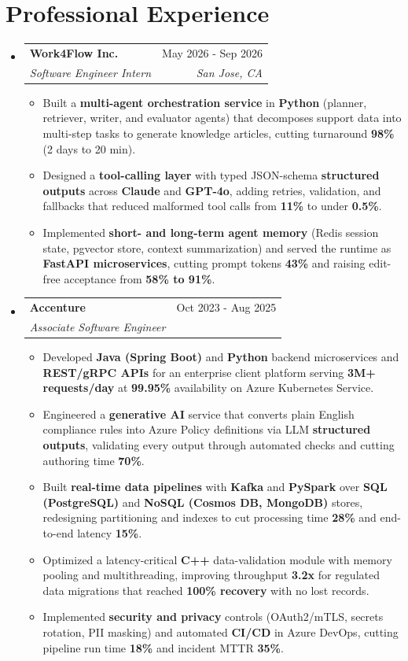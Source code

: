\documentclass[letterpaper,10.5pt]{article}
\makeatletter
\newcommand{\resumeItem}[1]{\item\small{{#1 \vspace{-2.5pt}}}}
\newcommand{\resumeSubheading}[4]{
  \vspace{-2pt}\item
    \begin{tabular*}{0.98\textwidth}[t]{l@{\extracolsep{\fill}}r}
      \textbf{#1} & #2 \\
      \textit{\small#3} & \textit{\small #4} \\
    \end{tabular*}\vspace{-6pt}
}
\newcommand{\sqbullet}{\raisebox{0.15ex}{\scriptsize$\blacksquare$}}
\newcommand{\resumeSubHeadingListStart}{\begin{itemize}[leftmargin=0.15in, label=\sqbullet]}
\newcommand{\resumeSubHeadingListEnd}{\end{itemize}}
\newcommand{\resumeItemListStart}{\begin{itemize}[leftmargin=0.2in, label=\textbf{-}]}
\newcommand{\resumeItemListEnd}{\end{itemize}\vspace{-4pt}}
\makeatother
\begin{document}
\section{Professional Experience}
  \resumeSubHeadingListStart
    \resumeSubheading
      {Work4Flow Inc.}{May 2026 - Sep 2026}
      {Software Engineer Intern}{San Jose, CA}
      \resumeItemListStart
        \resumeItem{Built a \textbf{multi-agent orchestration service} in \textbf{Python} (planner, retriever, writer, and evaluator agents) that decomposes support data into multi-step tasks to generate knowledge articles, cutting turnaround \textbf{98\%} (2 days to 20 min).}
        \resumeItem{Designed a \textbf{tool-calling layer} with typed JSON-schema \textbf{structured outputs} across \textbf{Claude} and \textbf{GPT-4o}, adding retries, validation, and fallbacks that reduced malformed tool calls from \textbf{11\%} to under \textbf{0.5\%}.}
        \resumeItem{Implemented \textbf{short- and long-term agent memory} (Redis session state, pgvector store, context summarization) and served the runtime as \textbf{FastAPI microservices}, cutting prompt tokens \textbf{43\%} and raising edit-free acceptance from \textbf{58\% to 91\%}.}
      \resumeItemListEnd
    \resumeSubheading
      {Accenture}{Oct 2023 - Aug 2025}
      {Associate Software Engineer}{}
      \resumeItemListStart
        \resumeItem{Developed \textbf{Java (Spring Boot)} and \textbf{Python} backend microservices and \textbf{REST/gRPC APIs} for an enterprise client platform serving \textbf{3M+ requests/day} at \textbf{99.95\%} availability on Azure Kubernetes Service.}
        \resumeItem{Engineered a \textbf{generative AI} service that converts plain English compliance rules into Azure Policy definitions via LLM \textbf{structured outputs}, validating every output through automated checks and cutting authoring time \textbf{70\%}.}
        \resumeItem{Built \textbf{real-time data pipelines} with \textbf{Kafka} and \textbf{PySpark} over \textbf{SQL (PostgreSQL)} and \textbf{NoSQL (Cosmos DB, MongoDB)} stores, redesigning partitioning and indexes to cut processing time \textbf{28\%} and end-to-end latency \textbf{15\%}.}
        \resumeItem{Optimized a latency-critical \textbf{C++} data-validation module with memory pooling and multithreading, improving throughput \textbf{3.2x} for regulated data migrations that reached \textbf{100\% recovery} with no lost records.}
        \resumeItem{Implemented \textbf{security and privacy} controls (OAuth2/mTLS, secrets rotation, PII masking) and automated \textbf{CI/CD} in Azure DevOps, cutting pipeline run time \textbf{18\%} and incident MTTR \textbf{35\%}.}
      \resumeItemListEnd
  \resumeSubHeadingListEnd
\end{document}
